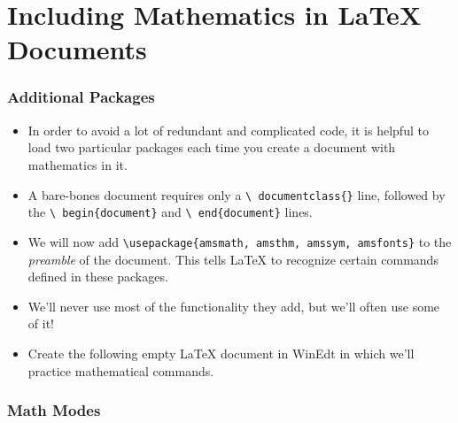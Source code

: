 \part{Including Mathematics in \LaTeX{} Documents}

\section{Additional Packages}

\begin{itemize}

\item In order to avoid a lot of redundant and complicated code, it is
  helpful to load two particular packages each time you create a
  document with mathematics in it.

\item A bare-bones document requires only a \texttt{\textbackslash
    documentclass\{\}} line, followed by the \texttt{\textbackslash
    begin\{document\}} and \texttt{\textbackslash
    end\{document\}} lines.

\item We will now add \texttt{\textbackslash usepackage\{amsmath,
    amsthm, amssym, amsfonts\}} to the \textit{preamble} of the
  document. This tells \LaTeX{} to recognize certain commands defined
  in these packages.

\item We'll never use most of the functionality they add, but we'll
  often use some of it!

\item Create the following empty \LaTeX{} document in WinEdt in which
  we'll practice mathematical commands.


\end{itemize}

\section{Math Modes}

